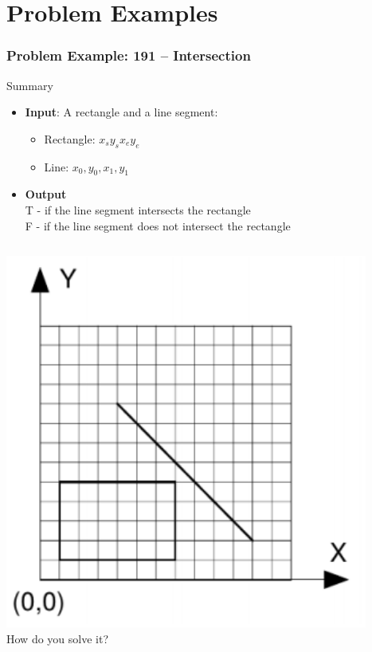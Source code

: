 \section{Problem Examples}

\begin{frame}
  \frametitle{Problem Example: 191 -- Intersection}
    \begin{block}{Summary}
      \begin{itemize}
      \item {\bf Input}: A rectangle and a line segment:
        \begin{itemize}
          \item Rectangle: $x_s y_s x_e y_e$
          \item Line: $x_0, y_0, x_1, y_1$
        \end{itemize}

      \item {\bf Output}\\
        T - if the line segment intersects the rectangle\\
        F - if the line segment does not intersect the rectangle\\
      \end{itemize}
    \end{block}
    \begin{columns}
      \includegraphics[width=1\textwidth]{img/intersection_uva}
      How do you solve it?
    \end{columns}

\end{frame}

